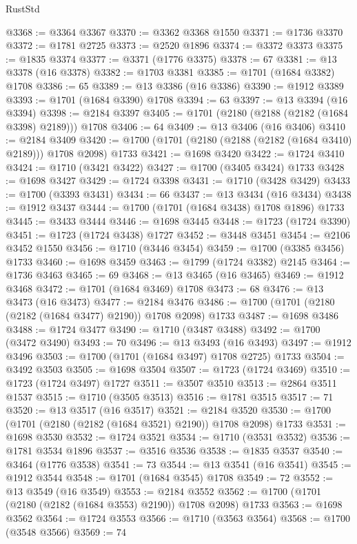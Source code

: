 \begin{lexlean}{RustStd}
\begin{coremodule}
@3368 := @3364 @3367
@3370 := @3362 @3368 @1550
@3371 := @1736 @3370
@3372 := @1781 @2725
@3373 := @2520 @1896
@3374 := @3372 @3373
@3375 := @1835 @3374
@3377 := @3371 (@1776 @3375)
@3378 := 67
@3381 := @13 @3378 (@16 @3378)
@3382 := @1703 @3381
@3385 := @1701 (@1684 @3382) @1708
@3386 := 65
@3389 := @13 @3386 (@16 @3386)
@3390 := @1912 @3389
@3393 := @1701 (@1684 @3390) @1708
@3394 := 63
@3397 := @13 @3394 (@16 @3394)
@3398 := @2184 @3397
@3405 := @1701 (@2180 (@2188 (@2182 (@1684 @3398) @2189))) @1708
@3406 := 64
@3409 := @13 @3406 (@16 @3406)
@3410 := @2184 @3409
@3420 := @1700 (@1701 (@2180 (@2188 (@2182 (@1684 @3410) @2189))) @1708 @2098) @1733
@3421 := @1698 @3420
@3422 := @1724 @3410
@3424 := @1710 (@3421 @3422)
@3427 := @1700 (@3405 @3424) @1733
@3428 := @1698 @3427
@3429 := @1724 @3398
@3431 := @1710 (@3428 @3429)
@3433 := @1700 (@3393 @3431)
@3434 := 66
@3437 := @13 @3434 (@16 @3434)
@3438 := @1912 @3437
@3444 := @1700 (@1701 (@1684 @3438) @1708 @1896) @1733
@3445 := @3433 @3444
@3446 := @1698 @3445
@3448 := @1723 (@1724 @3390)
@3451 := @1723 (@1724 @3438) @1727
@3452 := @3448 @3451
@3454 := @2106 @3452 @1550
@3456 := @1710 (@3446 @3454)
@3459 := @1700 (@3385 @3456) @1733
@3460 := @1698 @3459
@3463 := @1799 (@1724 @3382) @2145
@3464 := @1736 @3463
@3465 := 69
@3468 := @13 @3465 (@16 @3465)
@3469 := @1912 @3468
@3472 := @1701 (@1684 @3469) @1708
@3473 := 68
@3476 := @13 @3473 (@16 @3473)
@3477 := @2184 @3476
@3486 := @1700 (@1701 (@2180 (@2182 (@1684 @3477) @2190)) @1708 @2098) @1733
@3487 := @1698 @3486
@3488 := @1724 @3477
@3490 := @1710 (@3487 @3488)
@3492 := @1700 (@3472 @3490)
@3493 := 70
@3496 := @13 @3493 (@16 @3493)
@3497 := @1912 @3496
@3503 := @1700 (@1701 (@1684 @3497) @1708 @2725) @1733
@3504 := @3492 @3503
@3505 := @1698 @3504
@3507 := @1723 (@1724 @3469)
@3510 := @1723 (@1724 @3497) @1727
@3511 := @3507 @3510
@3513 := @2864 @3511 @1537
@3515 := @1710 (@3505 @3513)
@3516 := @1781 @3515
@3517 := 71
@3520 := @13 @3517 (@16 @3517)
@3521 := @2184 @3520
@3530 := @1700 (@1701 (@2180 (@2182 (@1684 @3521) @2190)) @1708 @2098) @1733
@3531 := @1698 @3530
@3532 := @1724 @3521
@3534 := @1710 (@3531 @3532)
@3536 := @1781 @3534 @1896
@3537 := @3516 @3536
@3538 := @1835 @3537
@3540 := @3464 (@1776 @3538)
@3541 := 73
@3544 := @13 @3541 (@16 @3541)
@3545 := @1912 @3544
@3548 := @1701 (@1684 @3545) @1708
@3549 := 72
@3552 := @13 @3549 (@16 @3549)
@3553 := @2184 @3552
@3562 := @1700 (@1701 (@2180 (@2182 (@1684 @3553) @2190)) @1708 @2098) @1733
@3563 := @1698 @3562
@3564 := @1724 @3553
@3566 := @1710 (@3563 @3564)
@3568 := @1700 (@3548 @3566)
@3569 := 74

\end{coremodule}
\end{lexlean}
